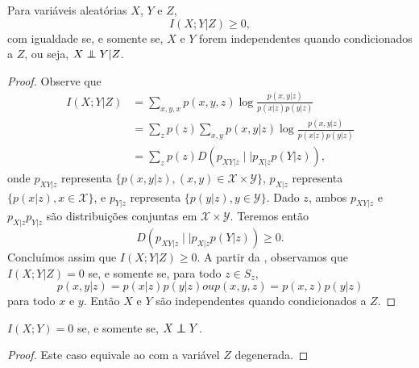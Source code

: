 \begin{theorem}\label{thm:infmutcondnnull}
  Para variáveis aleatórias $X$, $Y$ e $Z$,
  \begin{equation}
    I(X;Y|Z) \geq 0 ,
  \end{equation}
  com igualdade se, e somente se, $X$ e $Y$ forem independentes quando condicionados a $Z$, ou seja,
  $X \independent Y | Z$.
\end{theorem}
\begin{proof}
  Observe que
  \begin{subequations}
    \begin{align}
      I(X;Y|Z) &= \sum_{x,y,x} p(x,y,z) \log \frac{p(x,y|z)}{p(x|z) p(y|z)} \\
               &= \sum_z p(z) \sum_{x,y} p(x,y|z) \log \frac{p(x,y|z)}{p(x|z) p(y|z)} \\
               &= \sum_z p(z) D(p_{XY|z} \mid\mid p_{X|z} p(Y|z)) ,
    \end{align}
  \end{subequations}
  onde $p_{XY|z}$ representa $\{ p(x,y|z), (x,y) \in \mathcal{X} \times \mathcal{Y} \}$,
  $p_{X|z}$ representa $\{ p(x|z), x \in \mathcal{X} \}$, e
  $p_{Y|z}$ representa $\{ p(y|z), y \in \mathcal{Y} \}$.
  Dado $z$, ambos $p_{XY|z}$ e $p_{X|z}p_{Y|z}$ são distribuições conjuntas em $\mathcal{X} \times \mathcal{Y}$.
  Teremos então
  \begin{equation}
    D(p_{XY|z} \mid\mid p_{X|z} p(Y|z)) \geq 0 .
  \end{equation}
  Concluímos assim que $I(X;Y|Z) \geq 0$. A partir da , observamos que $I(X;Y|Z) = 0$ se, e somente se,
  para todo $z \in S_z$,
  \begin{subequations}
    \begin{equation}
    p(x,y|z) = p(x|z)p(y|z) 
    \end{equation}
    ou
    \begin{equation}
      p(x,y,z) = p(x,z)p(y|z)
    \end{equation}
  \end{subequations}
  para todo $x$ e $y$. Então $X$ e $Y$ são independentes quando condicionados a $Z$.
\end{proof}


\begin{proposition}\label{prop:indinfmutuanull}
  $I(X;Y) = 0$ se, e somente se, $X \independent Y$.
\end{proposition}
\begin{proof}
  Este caso equivale ao  com a variável $Z$ degenerada.
\end{proof}



